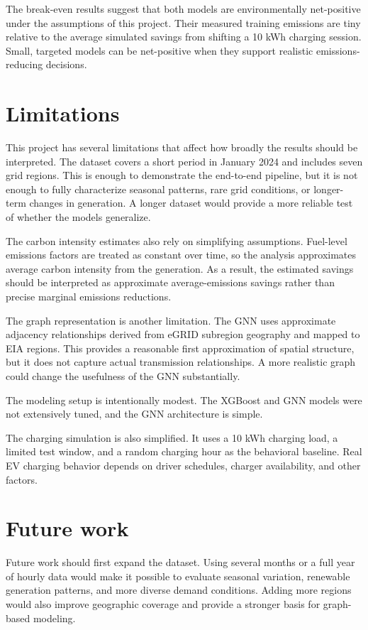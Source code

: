 \documentclass{article}
\begin{document}
The break-even results suggest that both models are environmentally net-positive under the assumptions of this project. Their measured training emissions are tiny relative to the average simulated savings from shifting a 10 kWh charging session. Small, targeted models can be net-positive when they support realistic emissions-reducing decisions.

\section{Limitations}

This project has several limitations that affect how broadly the results should be interpreted. The dataset covers a short period in January 2024 and includes seven grid regions. This is enough to demonstrate the end-to-end pipeline, but it is not enough to fully characterize seasonal patterns, rare grid conditions, or longer-term changes in generation. A longer dataset would provide a more reliable test of whether the models generalize.

The carbon intensity estimates also rely on simplifying assumptions. Fuel-level emissions factors are treated as constant over time, so the analysis approximates average carbon intensity from the generation. As a result, the estimated savings should be interpreted as approximate average-emissions savings rather than precise marginal emissions reductions.

The graph representation is another limitation. The GNN uses approximate adjacency relationships derived from eGRID subregion geography and mapped to EIA regions. This provides a reasonable first approximation of spatial structure, but it does not capture actual transmission relationships. A more realistic graph could change the usefulness of the GNN substantially.

The modeling setup is intentionally modest. The XGBoost and GNN models were not extensively tuned, and the GNN architecture is simple.

The charging simulation is also simplified. It uses a 10 kWh charging load, a limited test window, and a random charging hour as the behavioral baseline. Real EV charging behavior depends on driver schedules, charger availability, and other factors.

\section{Future work}

Future work should first expand the dataset. Using several months or a full year of hourly data would make it possible to evaluate seasonal variation, renewable generation patterns, and more diverse demand conditions. Adding more regions would also improve geographic coverage and provide a stronger basis for graph-based modeling.
\end{document}
